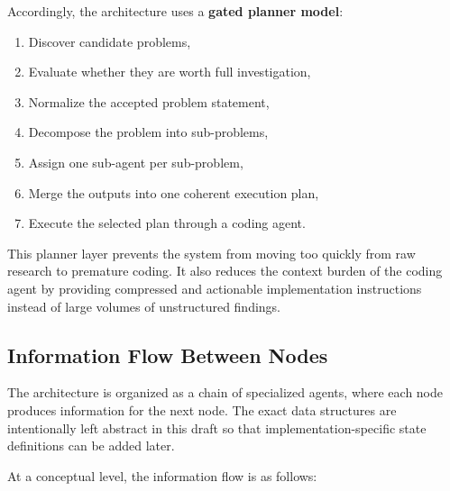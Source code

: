 \documentclass[11pt,a4paper]{article}
\begin{document}
Accordingly, the architecture uses a \textbf{gated planner model}:
\begin{enumerate}[label=\arabic*.]
    \item Discover candidate problems,
    \item Evaluate whether they are worth full investigation,
    \item Normalize the accepted problem statement,
    \item Decompose the problem into sub-problems,
    \item Assign one sub-agent per sub-problem,
    \item Merge the outputs into one coherent execution plan,
    \item Execute the selected plan through a coding agent.
\end{enumerate}

This planner layer prevents the system from moving too quickly from raw research to premature coding. It also reduces the context burden of the coding agent by providing compressed and actionable implementation instructions instead of large volumes of unstructured findings.

\subsection{Information Flow Between Nodes}

The architecture is organized as a chain of specialized agents, where each node produces information for the next node. The exact data structures are intentionally left abstract in this draft so that implementation-specific state definitions can be added later.

At a conceptual level, the information flow is as follows:
\end{document}

